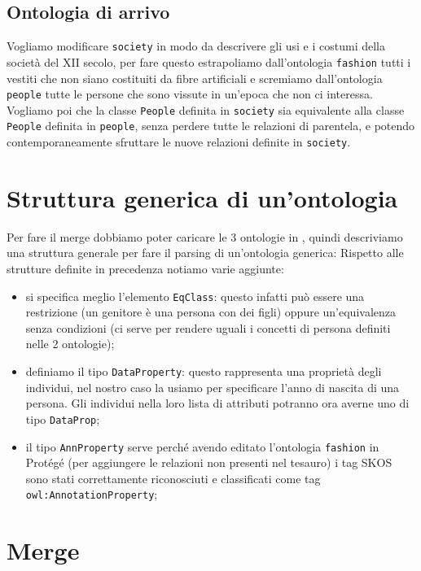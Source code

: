 \subsection{Ontologia di arrivo}
Vogliamo modificare \verb|society| in modo da descrivere gli usi e i costumi della società del XII secolo, per fare questo estrapoliamo dall'ontologia \verb|fashion| tutti i vestiti che non siano costituiti da fibre artificiali e scremiamo dall'ontologia \verb|people| tutte le persone che sono vissute in un'epoca che non ci interessa. Vogliamo poi che la classe \verb|People| definita in \verb|society| sia equivalente alla classe \verb|People| definita in \verb|people|, senza perdere tutte le relazioni di parentela, e potendo contemporaneamente sfruttare le nuove relazioni definite in \verb|society|.

\section{Struttura generica di un'ontologia}
Per fare il merge dobbiamo poter caricare le 3 ontologie in \cduce, quindi descriviamo una struttura generale per fare il parsing di un'ontologia generica:
\newpage
Rispetto alle strutture definite in precedenza notiamo varie aggiunte:
\begin{itemize}
	\item si specifica meglio l'elemento \verb|EqClass|: questo infatti può essere una restrizione (un genitore è una persona con dei figli) oppure un'equivalenza senza condizioni (ci serve per rendere uguali i concetti di persona definiti nelle 2 ontologie);
	\item definiamo il tipo \verb|DataProperty|: questo rappresenta una proprietà degli individui, nel nostro caso la usiamo per specificare l'anno di nascita di una persona. Gli individui nella loro lista di attributi potranno ora averne uno di tipo \verb|DataProp|;
	\item il tipo \verb|AnnProperty| serve perché avendo editato l'ontologia \verb|fashion| in Protégé (per aggiungere le relazioni non presenti nel tesauro) i tag SKOS sono stati correttamente riconosciuti \cite{OWL&SKOS} e classificati come tag \verb|owl:AnnotationProperty|;
\end{itemize}
\section{Merge}
